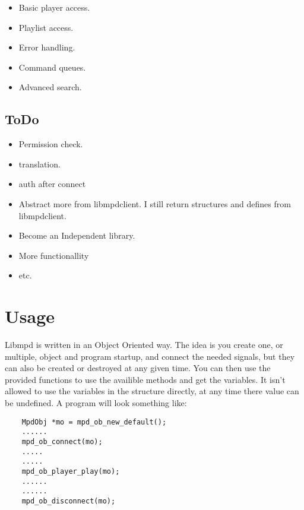 \documentclass[a4paper,11pt]{article}
\begin{document}
\begin{itemize}
  \item Basic player access.
  
  \item Playlist access.
  
  \item Error handling.
  
  \item Command queues.
  
  \item Advanced search.
\end{itemize}

\subsection{ToDo}
\begin{itemize}
  \item Permission check.
  
  \item translation.
  
  \item auth after connect
  
  \item Abstract more from libmpdclient. I still return structures and defines
  from libmpdclient.
  
  \item Become an Independent  library.
  
  \item More functionallity
  
  \item etc.
\end{itemize}

\section{Usage}
Libmpd is written in an Object Oriented way. The idea is you create one, or multiple, object and program startup, and connect the needed signals, but they can also be created or destroyed at any given time. 
You can then use the provided functions to use the availible methods and get the variables. It isn't allowed to use the variables in the structure directly, at any time there value can be undefined.
A program will look something like:
\begin{verbatim}
	MpdObj *mo = mpd_ob_new_default();
	......
	mpd_ob_connect(mo);
	.....
	.....
	mpd_ob_player_play(mo);
	......
	......
	mpd_ob_disconnect(mo);
\end{verbatim}
\end{document}
